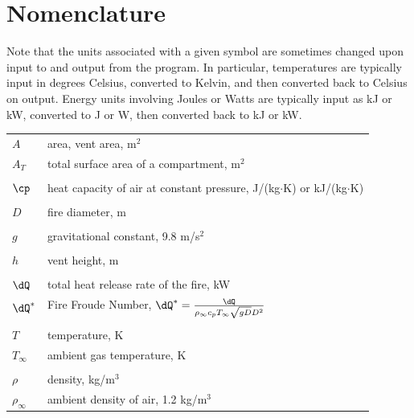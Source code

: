 \documentclass[12pt,twoside]{book}
\begin{document}
\printbibliography[heading=bibintoc,title={References}]

\appendix
{}

%
%

\chapter{Nomenclature}
\label{nomenclature}

Note that the units associated with a given symbol are sometimes changed upon input to and output from the program. In particular, temperatures are typically input in degrees Celsius, converted to Kelvin, and then converted back to Celsius on output. Energy units involving Joules or Watts are typically input as kJ or kW, converted to J or W, then converted back to kJ or kW.

\begin{center}
\begin{longtable}{p{1in}  p{5.5 in}}

$A$                 & area, vent area, m$^2$ \\
$A_T$               & total surface area of a compartment, m$^2$ \\ \\
$\cp$               & heat capacity of air at constant pressure, J/(kg$\cdot$K) or kJ/(kg$\cdot$K) \\ \\
$D$                 & fire diameter, m \\ \\
$g$                 & gravitational constant, 9.8 m/s$^2$ \\ \\
$h$                 & vent height, m \\ \\
$\dQ$               & total heat release rate of the fire, kW \\
$\dQ^*$             & Fire Froude Number,  $\dQ^* = \frac{\dQ}{\rho_\infty c_p T_\infty \sqrt{gD} D^2}$ \\ \\
$T$                 & temperature, K \\
$T_\infty$          & ambient gas temperature, K \\ \\
$\rho$              & density, kg/m$^3$ \\
$\rho_\infty$       & ambient density of air, 1.2 kg/m$^3$ \\
\end{longtable}

\end{center}






\label{last_page}
\end{document}
